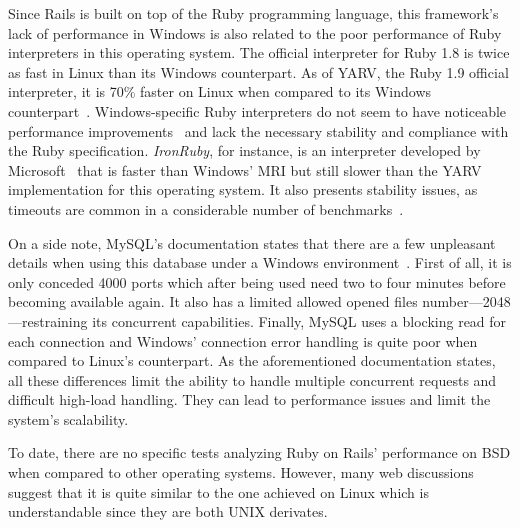 Since Rails is built on top of the Ruby programming language, this framework's lack of performance in Windows is also related to the poor performance of Ruby interpreters in this operating system. The official interpreter for Ruby 1.8 is twice as fast in Linux than its Windows counterpart. As of YARV, the Ruby 1.9 official interpreter, it is 70\% faster on Linux when compared to its Windows counterpart~\cite{ruby_faster_linux}. Windows-specific Ruby interpreters do not seem to have noticeable performance improvements~\cite{ruby.net} and lack the necessary stability and compliance with the Ruby specification. \textit{IronRuby}, for instance, is an interpreter developed by Microsoft~\cite{ror_ecosystem_whitepaper} that is faster than Windows' MRI but still slower than the YARV implementation for this operating system. It also presents stability issues, as timeouts are common in a considerable number of benchmarks~\cite{ironruby_performance}.

On a side note, MySQL's documentation states that there are a few unpleasant details when using this database under a Windows environment~\cite{mysql_windows_linux}. First of all, it is only conceded 4000 ports which after being used need two to four minutes before becoming available again. It also has a limited allowed opened files number---2048---restraining its concurrent capabilities. Finally, MySQL uses a blocking read for each connection and Windows' connection error handling is quite poor when compared to Linux's counterpart. As the aforementioned documentation states, all these differences limit the ability to handle multiple concurrent requests and difficult high-load handling. They can lead to performance issues and limit the system's scalability.

To date, there are no specific tests analyzing Ruby on Rails' performance on BSD when compared to other operating systems. However, many web discussions suggest that it is quite similar to the one achieved on Linux which is understandable since they are both UNIX derivates.
